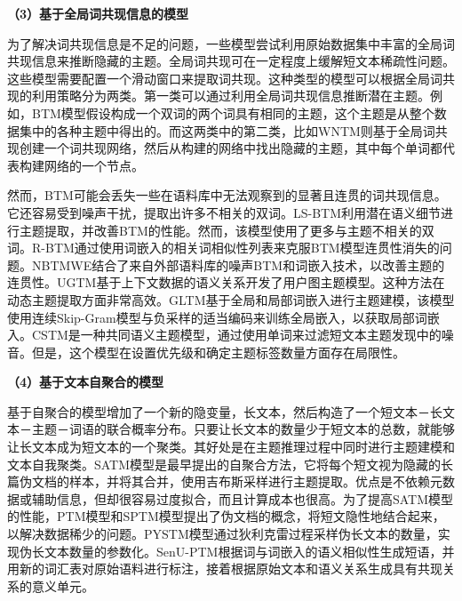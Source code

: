 \textbf{（3）基于全局词共现信息的模型}

为了解决词共现信息是不足的问题，一些模型尝试利用原始数据集中丰富的全局词共现信息来推断隐藏的主题。全局词共现可在一定程度上缓解短文本稀疏性问题。这些模型需要配置一个滑动窗口来提取词共现。这种类型的模型可以根据全局词共现的利用策略分为两类。第一类可以通过利用全局词共现信息推断潜在主题。例如，BTM\cite{BTM}模型假设构成一个双词的两个词具有相同的主题，这个主题是从整个数据集中的各种主题中得出的。而这两类中的第二类，比如WNTM\cite{WNTM}则基于全局词共现创建一个词共现网络，然后从构建的网络中找出隐藏的主题，其中每个单词都代表构建网络的一个节点。

然而，BTM可能会丢失一些在语料库中无法观察到的显著且连贯的词共现信息。它还容易受到噪声干扰，提取出许多不相关的双词。LS-BTM\cite{LS-BTM}利用潜在语义细节进行主题提取，并改善BTM的性能。然而，该模型使用了更多与主题不相关的双词。R-BTM\cite{R-BTM}通过使用词嵌入的相关词相似性列表来克服BTM模型连贯性消失的问题。NBTMWE\cite{NBTMWE}结合了来自外部语料库的噪声BTM和词嵌入技术，以改善主题的连贯性。UGTM\cite{UGTM}基于上下文数据的语义关系开发了用户图主题模型。这种方法在动态主题提取方面非常高效。GLTM\cite{GLTM}基于全局和局部词嵌入进行主题建模，该模型使用连续Skip-Gram模型与负采样的适当编码来训练全局嵌入，以获取局部词嵌入。CSTM是一种共同语义主题模型，通过使用单词来过滤短文本主题发现中的噪音。但是，这个模型在设置优先级和确定主题标签数量方面存在局限性。

\textbf{（4）基于文本自聚合的模型}

基于自聚合的模型增加了一个新的隐变量，长文本，然后构造了一个短文本－长文本－主题－词语的联合概率分布。只要让长文本的数量少于短文本的总数，就能够让长文本成为短文本的一个聚类。其好处是在主题推理过程中同时进行主题建模和文本自我聚类。SATM\cite{SATM}模型是最早提出的自聚合方法，它将每个短文视为隐藏的长篇伪文档的样本，并将其合并，使用吉布斯采样进行主题提取。优点是不依赖元数据或辅助信息，但却很容易过度拟合，而且计算成本也很高。为了提高SATM模型的性能，PTM\cite{PTM}模型和SPTM\cite{SPTM}模型提出了伪文档的概念，将短文隐性地结合起来，以解决数据稀少的问题。PYSTM\cite{PYSTM}模型通过狄利克雷过程采样伪长文本的数量，实现伪长文本数量的参数化。SenU-PTM\cite{SenU-PTM}根据词与词嵌入的语义相似性生成短语，并用新的词汇表对原始语料进行标注，接着根据原始文本和语义关系生成具有共现关系的意义单元。

